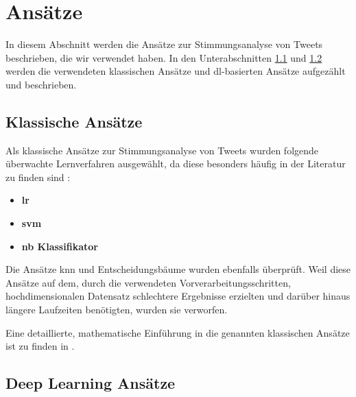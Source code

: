 \section{Ansätze}

In diesem Abschnitt werden die Ansätze zur Stimmungsanalyse von Tweets beschrieben, die wir verwendet haben.
In den Unterabschnitten \ref{subsec:klassische-ansaetze} und \ref{subsec:deep-learning-ansaetze} werden die verwendeten klassischen Ansätze und \gls{dl}-basierten Ansätze aufgezählt und beschrieben.

\subsection{Klassische Ansätze}\label{subsec:klassische-ansaetze}

Als klassische Ansätze zur Stimmungsanalyse von Tweets wurden folgende überwachte Lernverfahren ausgewählt, da diese besonders häufig in der Literatur zu finden sind \cite{medhat2014sentiment, wankhade2022survey, zimbra2018state}:

\begin{itemize}
    \item \textbf{\gls{lr}}  \hspace{\fill}
    \item \textbf{\gls{svm}} \hspace{\fill}
    \item \textbf{\gls{nb} Klassifikator} \hspace{\fill}
\end{itemize}

Die Ansätze \gls{knn} und Entscheidungsbäume wurden ebenfalls überprüft.
Weil diese Ansätze auf dem, durch die verwendeten Vorverarbeitungsschritten, hochdimensionalen Datensatz schlechtere Ergebnisse erzielten und darüber hinaus längere Laufzeiten benötigten, wurden sie verworfen.

Eine detaillierte, mathematische Einführung in die genannten klassischen Ansätze ist zu finden in \cite[Kapitel 4.4 für \gls{lr}, 4.5 und 12 für \gls{svm}, 6.6.3 für den \gls{nb}-Klassifikator, 13.3 für \gls{knn} und 9.2 für Entscheidungsbäume]{hastie2009elements}.

\subsection{Deep Learning Ansätze}\label{subsec:deep-learning-ansaetze}

